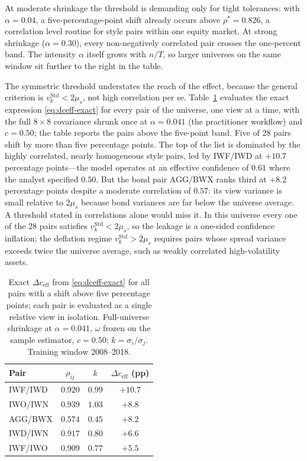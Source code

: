 \documentclass[a4paper,11pt]{article}
\theoremstyle{plain}
\theoremstyle{definition}
\newcommand{\Std}{\mathrm{Std}}
\newcommand{\eff}{\mathrm{eff}}
\begin{document}
At moderate shrinkage the threshold is demanding only for tight
tolerances: with $\alpha = 0.04$, a five-percentage-point shift already
occurs above $\rho^* = 0.826$, a correlation level routine for style
pairs within one equity market. At strong shrinkage ($\alpha = 0.30$),
every non-negatively correlated pair crosses the one-percent band. The
intensity $\alpha$ itself grows with $n/T$, so larger universes on the
same window sit further to the right in the table.

The symmetric threshold understates the reach of the effect, because the
general criterion is $v_k^\Std < 2\mu_s$, not high correlation per se.
Table~\ref{tab:pairs} evaluates the exact expression
\eqref{eq:dceff-exact} for every pair of the universe, one view at a
time, with the full $8\times 8$ covariance shrunk once at
$\alpha = 0.041$ (the practitioner workflow) and $c = 0.50$; the table
reports the pairs above the five-point band. Five of 28 pairs shift by
more than five percentage points. The top of the list is dominated by
the highly correlated, nearly homogeneous style pairs, led by IWF/IWD at
$+10.7$ percentage points---the model operates at an effective
confidence of $0.61$ where the analyst specified $0.50$. But the bond
pair AGG/BWX ranks third at $+8.2$ percentage points despite a moderate
correlation of $0.57$: its view variance is small relative to $2\mu_s$
because bond variances are far below the universe average. A threshold
stated in correlations alone would miss it. In this universe every one
of the 28 pairs satisfies $v_k^\Std < 2\mu_s$, so the leakage is a
one-sided confidence inflation; the deflation regime
$v_k^\Std > 2\mu_s$ requires pairs whose spread variance exceeds twice
the universe average, such as weakly correlated high-volatility assets.

\begin{table}[H]
\centering
\caption{Exact $\Delta c_{\eff}$ from \eqref{eq:dceff-exact} for all
pairs with a shift above five percentage points; each pair is evaluated
as a single relative view in isolation. Full-universe shrinkage at
$\alpha = 0.041$, $\omega$ frozen on the sample estimator,
$c = 0.50$; $k = \sigma_i/\sigma_j$. Training window 2008--2018.}
\label{tab:pairs}
\begin{tabular}{lccc}
\toprule
Pair & $\rho_{ij}$ & $k$ & $\Delta c_{\eff}$ (pp) \\
\midrule
IWF/IWD & $0.920$ & $0.99$ & $+10.7$ \\
IWO/IWN & $0.939$ & $1.03$ & $+8.8$ \\
AGG/BWX & $0.574$ & $0.45$ & $+8.2$ \\
IWD/IWN & $0.917$ & $0.80$ & $+6.6$ \\
IWF/IWO & $0.909$ & $0.77$ & $+5.5$ \\
\bottomrule
\end{tabular}
\end{table}
\end{document}
